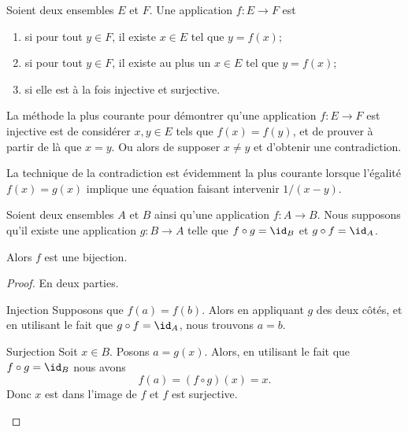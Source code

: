 \begin{definition}
    Soient deux ensembles \( E\) et \( F\). Une application \( f\colon E\to F\) est
    \begin{enumerate}
        \item
             si pour tout \( y\in F\), il existe \( x\in E\) tel que \( y=f(x)\);
        \item
             si pour tout \( y\in F\), il existe au plus un \(x\in E \) tel que \( y=f(x)\);
        \item
             si elle est à la fois injective et surjective.
    \end{enumerate}
\end{definition}
La méthode la plus courante pour démontrer qu'une application \( f\colon E\to F\) est injective est de considérer \( x,y\in E\) tels que \( f(x)=f(y)\), et de prouver à partir de là que \( x=y\). Ou alors de supposer \( x\neq y\) et d'obtenir une contradiction.

La technique de la contradiction est évidemment la plus courante lorsque l'égalité \( f(x)=g(x)\) implique une équation faisant intervenir \( 1/(x-y)\).

\begin{lemma}       \label{LEMooWBYSooFqyqQP}
    Soient deux ensembles \( A\) et \( B\) ainsi qu'une application \( f\colon A\to B\). Nous supposons qu'il existe une application \( g\colon B\to A\) telle que \( f\circ g=\id_B\) et \( g\circ f=\id_A\).

    Alors \( f\) est une bijection.
\end{lemma}

\begin{proof}
    En deux parties.
    \begin{subproof}
    \item[Injection]
        Supposons que \( f(a)=f(b)\). Alors en appliquant \( g\) des deux côtés, et en utilisant le fait que \( g\circ f=\id_A\), nous trouvons \( a=b\).
    \item[Surjection]
        Soit \( x\in B\). Posons \( a=g(x)\). Alors, en utilisant le fait que \( f\circ g=\id_B\) nous avons
        \begin{equation}
            f(a)=(f\circ g)(x)=x.
        \end{equation}
        Donc \( x\) est dans l'image de \( f\) et \( f\) est surjective.
    \end{subproof}
\end{proof}


